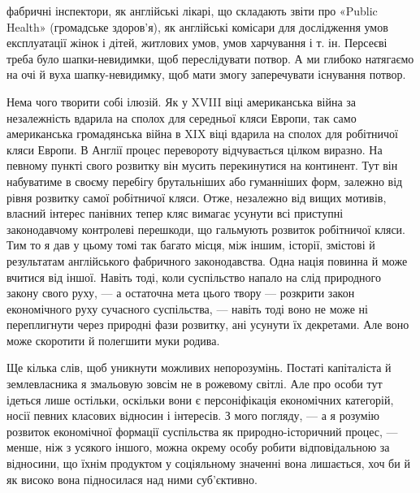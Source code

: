 \parcont{}  %
фабричні інспектори, як англійські лікарі, що складають звіти
про «Public Health» (громадське здоров’я), як англійські комісари
для дослідження умов експлуатації жінок і дітей, житлових
умов, умов харчування і т. ін. Персеєві треба було шапки-невидимки,
щоб переслідувати потвор. А ми глибоко натягаємо на очі
й вуха шапку-невидимку, щоб мати змогу заперечувати існування
потвор.

Нема чого творити собі ілюзій. Як у XVIII віці американська
війна за незалежність вдарила на сполох для середньої кляси
Европи, так само американська громадянська війна в XIX віці
вдарила на сполох для робітничої кляси Европи. В Англії процес
перевороту відчувається цілком виразно. На певному пункті свого
розвитку він мусить перекинутися на континент. Тут він набуватиме
в своєму перебігу брутальніших або гуманніших форм, залежно
від рівня розвитку самої робітничої кляси. Отже, незалежно
від вищих мотивів, власний інтерес панівних тепер кляс вимагає
усунути всі приступні законодавчому контролеві перешкоди, що
гальмують розвиток робітничої кляси. Тим то я дав у цьому
томі так багато місця, між іншим, історії, змістові й результатам
англійського фабричного законодавства. Одна нація повинна й
може вчитися від іншої. Навіть тоді, коли суспільство напало на
слід природного закону свого руху, — а остаточна мета цього
твору — розкрити закон економічного руху сучасного суспільства,
— навіть тоді воно не може ні переплигнути через природні
фази розвитку, ані усунути їх декретами. Але воно може скоротити
й полегшити муки родива.

Ще кілька слів, щоб уникнути можливих непорозумінь. Постаті
капіталіста й землевласника я змальовую зовсім не в рожевому
світлі. Але про особи тут ідеться лише остільки, оскільки вони є
персоніфікація економічних категорій, носії певних класових
відносин і інтересів. З мого погляду, — а я розумію розвиток економічної
формації суспільства як природно-історичний процес, —
менше, ніж з усякого іншого, можна окрему особу робити відповідальною
за відносини, що їхнім продуктом у соціяльному значенні
вона лишається, хоч би й як високо вона підносилася над
ними суб’єктивно.

